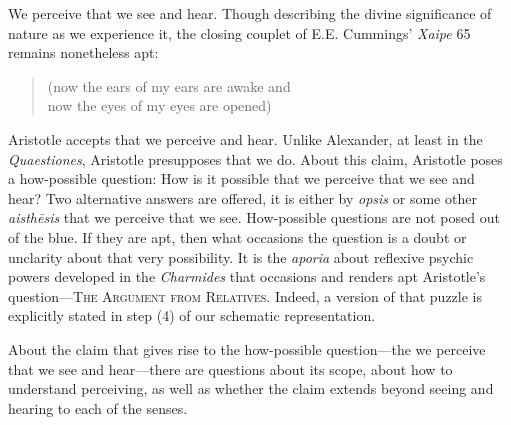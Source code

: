 We perceive that we see and hear. Though describing the divine significance of nature as we experience it, the closing couplet of E.E. Cummings' \emph{Xaipe} 65 remains nonetheless apt:  
\begin{verse}
	(now the ears of my ears are awake and\\
	now the eyes of my eyes are opened) \citep[70]{Cummings:1950aa}
\end{verse}
Aristotle accepts that we perceive and hear. Unlike Alexander, at least in the \emph{Quaestiones}, Aristotle presupposes that we do. About this claim, Aristotle poses a how-possible question: How is it possible that we perceive that we see and hear? Two alternative answers are offered, it is either by \emph{opsis} or some other \emph{aisthēsis} that we perceive that we see. How-possible questions are not posed out of the blue. If they are apt, then what occasions the question is a doubt or unclarity about that very possibility. It is the \emph{aporia} about reflexive psychic powers developed in the \emph{Charmides} that occasions and renders apt Aristotle's question—\textsc{The Argument from Relatives}. Indeed, a version of that puzzle is explicitly stated in step (4) of our schematic representation.

About the claim that gives rise to the how-possible question—the we perceive that we see and hear—there are questions about its scope, about how to understand perceiving, as well as whether the claim extends beyond seeing and hearing to each of the senses.

